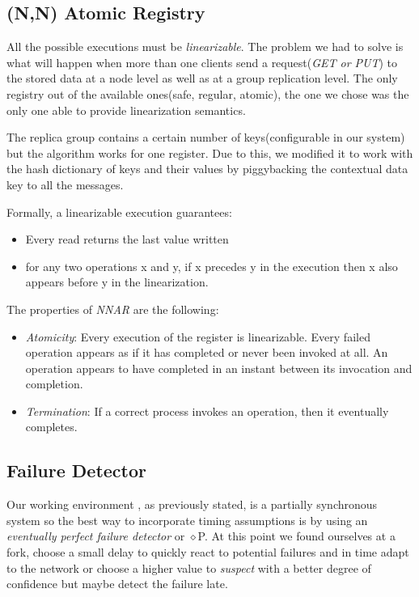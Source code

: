 \documentclass[a4paper, 11pt]{article}
\begin{document}
\subsection{(N,N) Atomic Registry}

All the possible executions must be \textit{linearizable}. The problem we had to solve is what will happen when more than one clients send a request(\textit{GET or PUT}) to the stored data at a node level as well as at a group replication level. The only registry out of the available ones(safe, regular, atomic), the one we chose was the only one able to provide linearization semantics. \par

The replica group contains a certain number of keys(configurable in our system) but the algorithm works for one register. Due to this, we modified it to work with the hash dictionary of keys and their values by piggybacking the contextual data key to all the messages. \par

Formally, a linearizable execution guarantees:
\begin{itemize}
	\item Every read returns the last value written
	\item for any two operations x and y, if x precedes y in the execution then x also appears before y in the linearization.
\end{itemize}

The properties of \textit{NNAR} are the following:
\begin{itemize}
	\item \textit{Atomicity}: Every execution of the register is linearizable. Every failed operation appears as if it has completed or never been invoked at all. An operation appears to have completed in an instant between its invocation and completion.
	\item \textit{Termination}: If a correct process invokes an operation, then it eventually completes.
	
\end{itemize}

\subsection{Failure Detector}

Our working environment , as previously stated, is a partially synchronous system so the best way to incorporate timing assumptions is by using an \textit{eventually perfect failure detector} or $\diamond$P. At this point we found ourselves at a fork, choose a small delay to quickly react to potential failures and in time adapt to the network or choose a higher value to \textit{suspect} with a better degree of confidence but maybe detect the failure late. \par
\end{document}

